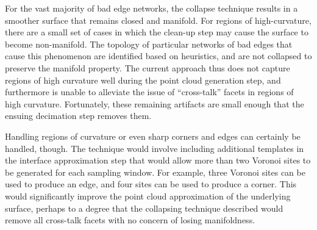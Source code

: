For the vast majority of bad edge networks, the collapse technique results in a smoother surface that remains closed and manifold. For regions of high-curvature, there are a small set of cases in which the clean-up step may cause the surface to become non-manifold. The topology of particular networks of bad edges that cause this phenomenon are identified based on heuristics, and are not collapsed to preserve the manifold property. The current approach thus does not capture regions of high curvature well during the point cloud generation step, and furthermore is unable to alleviate the issue of ``cross-talk'' facets in regions of high curvature. Fortunately, these remaining artifacts are small enough that the ensuing decimation step removes them.

Handling regions of curvature or even sharp corners and edges can certainly be handled, though. The technique would involve including additional templates in the interface approximation step that would allow more than two Voronoi sites to be generated for each sampling window. For example, three Voronoi sites can be used to produce an edge, and four sites can be used to produce a corner. This would significantly improve the point cloud approximation of the underlying surface, perhaps to a degree that the collapsing technique described would remove all cross-talk facets with no concern of losing manifoldness.

